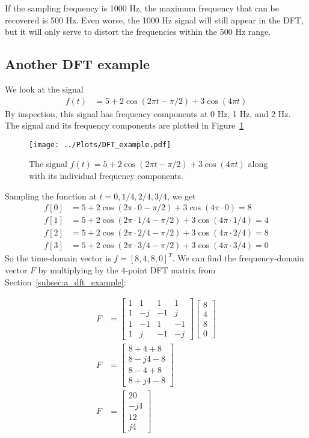 \documentclass[twocolumn]{myarticle}
\newcommand{\mat}[1]{\begin{bmatrix}#1\end{bmatrix}}
\begin{document}
If the sampling frequency is 1000 Hz, the maximum frequency that can be recovered is 500 Hz.
Even worse, the 1000 Hz signal will still appear in the DFT, but it will only serve to distort the frequencies within the 500 Hz range.

\subsection{Another DFT example}
\label{subsec:another_dft_example}

We look at the signal
\begin{align}
    f(t) &= 5 + 2 \cos(2 \pi t - \pi/2) + 3 \cos(4 \pi t)
\end{align}
By inspection, this signal has frequency components at 0 Hz, 1 Hz, and 2 Hz.
The signal and its frequency components are plotted in Figure~\ref{fig:dft_example}

\begin{figure}[ht]
    \centering
    \texttt{[image: ../Plots/DFT\_example.pdf]}
    \caption{The signal $ f(t) = 5 + 2 \cos(2 \pi t - \pi/2) + 3 \cos(4 \pi t)
$ along with its individual frequency components.}
    \label{fig:dft_example}
\end{figure}

Sampling the function at $ t = 0, 1/4, 2/4, 3/4 $, we get
\begin{align}
    f[0] &= 5 + 2 \cos(2 \pi \cdot 0 - \pi/2) + 3 \cos(4 \pi \cdot 0) = 8
    \\
    f[1] &= 5 + 2 \cos(2 \pi \cdot 1/4 - \pi/2) + 3 \cos(4 \pi \cdot 1/4) = 4
    \\
    f[2] &= 5 + 2 \cos(2 \pi \cdot 2/4 - \pi/2) + 3 \cos(4 \pi \cdot 2/4) = 8
    \\
    f[3] &= 5 + 2 \cos(2 \pi \cdot 3/4 - \pi/2) + 3 \cos(4 \pi \cdot 3/4) = 0
\end{align}
So the time-domain vector is $ f = \left[ 8, 4, 8, 0 \right]^T $.
We can find the frequency-domain vector $ F $ by multiplying by the 4-point DFT matrix from Section~\ref{subsec:a_dft_example}:

\begin{align}
    F &= \mat{1 & 1 & 1 & 1 \\ 1 & -j & -1 & j \\ 1 & -1 & 1 & -1 \\ 1 & j & -1 & -j } \mat{8 \\ 4 \\ 8 \\ 0}
    \\
    F &= \mat{8 + 4 + 8 \\ 8 - j4 - 8 \\ 8 - 4 + 8 \\ 8 + j4 - 8}
    \\
    F &= \mat{ 20 \\ - j4 \\ 12 \\ j4 }
\end{align}
\end{document}
